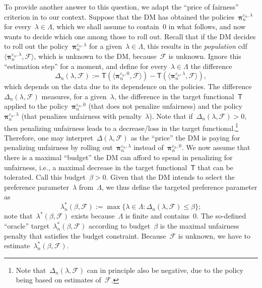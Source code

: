 \documentclass[11pt, a4paper]{article}
\theoremstyle{definition}
\begin{document}
To provide another answer to this question, we adapt the ``price of fairness'' criterion in \cite{berk2017convex} to our context. Suppose that the DM has obtained the policies~$\bm{\pi}_{n}^{\varepsilon_n, \lambda}$ for every~$\lambda \in \Lambda$, which we shall assume to contain~$0$ in what follows, and now wants to decide which one among those to roll out. Recall that if the DM decides to roll out the policy~$\bm{\pi}_{n}^{\varepsilon_n, \lambda}$ for a given~$\lambda \in \Lambda$, this results in the \emph{population} cdf~$\langle \bm{\pi}_{n}^{\varepsilon_n, \lambda}, \mathcal{F} \rangle$, which is unknown to the DM, because~$\mathcal{F}$ is unknown. Ignore this ``estimation step'' for a moment, and define for every~$\lambda \in \Lambda$ the difference $$\Delta_n(\lambda, \mathcal{F}) := \mathsf{T}(\langle \bm{\pi}_{n}^{\varepsilon_n, 0}, \mathcal{F} \rangle) - \mathsf{T}(\langle \bm{\pi}_{n}^{\varepsilon_n, \lambda}, \mathcal{F} \rangle),$$ which depends on the data due to its dependence on the policies. The difference~$\Delta_n(\lambda, \mathcal{F})$ measures, for a given~$\lambda$, the difference in the target functional~$\mathsf{T}$ applied to the policy~$\bm{\pi}_{n}^{\varepsilon_n, 0}$ (that does not penalize unfairness) and the policy~$\bm{\pi}_{n}^{\varepsilon_n, \lambda}$ (that penalizes unfairness with penalty~$\lambda$). Note that if~$\Delta_n(\lambda, \mathcal{F}) > 0$, then penalizing unfairness leads to a decrease/loss in the target functional.\footnote{Note that~$\Delta_n(\lambda, \mathcal{F})$ can in principle also be negative, due to the policy being based on estimates of~$\mathcal{F}$.} Therefore, one may interpret~$\Delta(\lambda, \mathcal{F})$ as the ``price'' the DM is paying for penalizing unfairness by rolling out~$\bm{\pi}_n^{\varepsilon_n, \lambda}$ instead of~$\bm{\pi}_n^{\varepsilon_n, 0}$. We now assume that there is a maximal ``budget'' the DM can afford to spend in penalizing for unfairness, i.e., a maximal decrease in the
target functional~$\mathsf{T}$ that can be
tolerated. Call this budget~$\beta > 0$. Given that the DM intends to select the preference parameter~$\lambda$ from~$\Lambda$, we thus define the targeted preference parameter as 
\begin{equation}\label{eqn:lstardef}
\lambda^{*}_n(\beta, \mathcal{F}) := \max \{\lambda \in \Lambda: \Delta_n(\lambda, \mathcal{F}) \leq \beta\};
\end{equation} note that~$\lambda^{*}(\beta, \mathcal{F})$ exists because~$\Lambda$ is finite and contains~$0$. The so-defined ``oracle'' target~$\lambda^{*}_n(\beta, \mathcal{F})$ according to budget~$\beta$ is the maximal unfairness penalty that satisfies the budget constraint. Because~$\mathcal{F}$ is unknown, we have to estimate~$\lambda^{*}_n(\beta, \mathcal{F})$.
\end{document}
